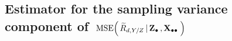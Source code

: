 

\vskip 0.5cm
\subsection{Estimator for the sampling variance component of
\,$\textnormal{MSE}\!\left(\,\widetilde{R}_{d,Y/Z}\left\vert\,\mathbf{Z}_{\bullet}\,,\mathbf{X}_{\bullet\bullet}\,\right.\right)$}
\setcounter{theorem}{0}


